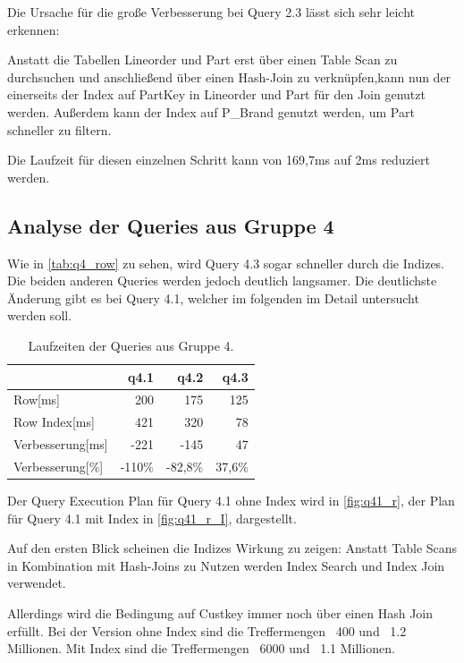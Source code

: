 Die Ursache für die große Verbesserung bei Query 2.3 lässt sich sehr leicht erkennen:

Anstatt die Tabellen Lineorder und Part erst über einen Table Scan zu durchsuchen und anschließend über einen Hash-Join zu verknüpfen,kann nun der einerseits der Index
auf PartKey in Lineorder und Part für den Join genutzt werden. Außerdem kann der Index auf P\_Brand genutzt werden, um Part schneller zu filtern. 

Die Laufzeit für diesen einzelnen Schritt kann von 169,7ms auf 2ms reduziert werden.


\subsection{Analyse der Queries aus Gruppe 4}

Wie in \autoref{tab:q4_row} zu sehen, wird Query 4.3 sogar schneller durch die Indizes. 
Die beiden anderen Queries werden jedoch deutlich langsamer. Die deutlichste Änderung 
gibt es bei Query 4.1, welcher im folgenden im Detail untersucht werden soll.

\setlength\intextsep{0pt}
\begin{table}[H]
    \begin{tabularx}{\linewidth}{lrrr}
        \toprule
                        & q4.1      &	q4.2        &	q4.3       \\
        \toprule
        Row[ms]	        & 200	    &	175	        &	125        \\
        Row Index[ms]   & 421	    &   320	        &   78          \\
        Verbesserung[ms]  & -221      &   -145        &   47         \\
        Verbesserung[\%]  & -110\%    &   -82,8\%     &   37,6\%       \\    
\bottomrule
\end{tabularx}
\caption{Laufzeiten der Queries aus Gruppe 4.}
\label{tab:q4_row}
\end{table}

Der Query Execution Plan für Query 4.1 ohne Index wird in \autoref{fig:q41_r}, der Plan für Query 4.1 mit Index in \autoref{fig:q41_r_I}, dargestellt.

Auf den ersten Blick scheinen die Indizes Wirkung zu zeigen: Anstatt Table Scans in Kombination mit Hash-Joins zu Nutzen werden Index Search und Index Join verwendet.

Allerdings wird die Bedingung auf Custkey immer noch über einen Hash Join erfüllt. Bei der Version ohne Index sind die Treffermengen ~400 und ~1.2 Millionen.
Mit Index sind die Treffermengen ~6000 und ~1.1 Millionen.

